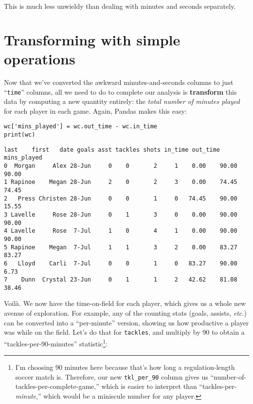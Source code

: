 This is much less unwieldy than dealing with minutes and seconds separately.

\section{Transforming with simple operations}



Now that we've converted the awkward minutes-and-seconds columns to just
``\texttt{time}'' columns, all we need to do to complete our analysis is
\textbf{transform} this data by computing a new quantity entirely: the
\textit{total number of minutes played} for each player in each game. Again,
Pandas makes this easy:

\begin{Verbatim}[fontsize=\small,samepage=true,frame=single,framesep=3mm]
wc['mins_played'] = wc.out_time - wc.in_time
print(wc)
\end{Verbatim}
\vspace{-.2in}

\begin{Verbatim}[fontsize=\footnotesize,samepage=true,frame=leftline,framesep=5mm,framerule=1mm]
     last    first   date goals asst tackles shots in_time out_time mins_played
0  Morgan     Alex 28-Jun     0    0       2     1    0.00    90.00       90.00
1 Rapinoe    Megan 28-Jun     2    0       2     3    0.00    74.45       74.45
2   Press Christen 28-Jun     0    0       1     0   74.45    90.00       15.55
3 Lavelle     Rose 28-Jun     0    1       3     0    0.00    90.00       90.00
4 Lavelle     Rose  7-Jul     1    0       4     1    0.00    90.00       90.00
5 Rapinoe    Megan  7-Jul     1    1       3     2    0.00    83.27       83.27
6   Lloyd    Carli  7-Jul     0    0       1     0   83.27    90.00        6.73
7    Dunn  Crystal 23-Jun     0    1       1     2   42.62    81.08       38.46
\end{Verbatim}


Voil\`{a}. We now have the time-on-field for each player, which gives us a
whole new avenue of exploration. For example, any of the counting stats (goals,
assists, \textit{etc.}) can be converted into a ``per-minute'' version, showing
us how productive a player was while on the field. Let's do that for
\texttt{tackles}, and multiply by 90 to obtain a ``tackles-per-90-minutes''
statistic\footnote{I'm choosing 90 minutes here because that's how long a
regulation-length soccer match is. Therefore, our new \texttt{tkl\_per\_90}
column gives us ``number-of-tackles-per-complete-game,'' which is easier to
interpret than ``tackles-per-\textit{minute},'' which would be a miniscule
number for any player.}:

